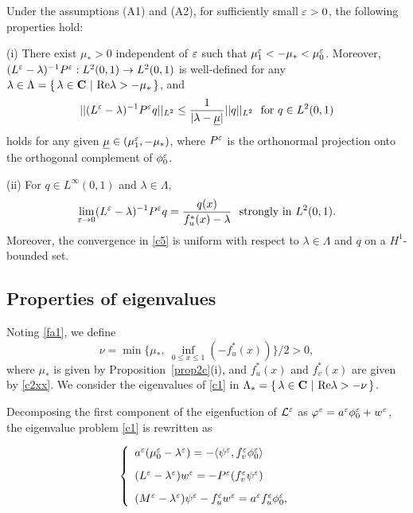 \documentclass[a4,10pt]{article}
\begin{document}
\begin{prop}\label{prop2c} 
Under the assumptions (A1) and (A2), for sufficiently small $\varepsilon > 0$, the following properties hold:

\no
{\rm (i)}  There exist $\mu_* > 0$ independent of $\varepsilon$
such that $ \mu_1^\varepsilon <  -\mu_* < \mu_0^\varepsilon$. Moreover,
$(L^\varepsilon - \lambda )^{-1}P^\varepsilon : L^2(0, 1) \to L^2(0, 1)$ is well-defined 
for any $\lambda \in \Lambda = 
\{ \, \lambda \in \mbox{\bf C} \  | \ \mbox{\rm Re} \lambda > - \mu_* \, \}$, and
%
\begin{equation}\label{c5z}
|| (L^\varepsilon - \lambda )^{-1}P^\varepsilon q ||_{L^2} \leq \displaystyle\frac{1}{|\lambda - \underline{\mu}|} ||q||_{L^2} \ \  \text{for} \ q \in L^2(0,1)
\end{equation}
%
holds for any given $\underline{\mu} \in ( \mu_1^\varepsilon, -\mu_*)$,
where $P^\varepsilon$ is the orthonormal projection onto the orthogonal complement of $\phi_0^\varepsilon$.

\no
{\rm (ii)} For $q \in L^\infty(0, 1)$ and $\lambda \in \Lambda$, 
%
\begin{equation}\label{c5}
\displaystyle\lim_{\varepsilon \to 0} (L^\varepsilon - \lambda)^{-1} P^\varepsilon q = \frac{ q(x)}{f_u^*(x) - \lambda}
\ \ \text{strongly in} \ L^2(0, 1).
\end{equation}
%
Moreover, the convergence in \eqref{c5}
is uniform with respect to $\lambda \in \Lambda$ and $q$ on a $H^1$-bounded set.
\end{prop}



\subsection{Properties of eigenvalues} \rm

Noting \eqref{fa1}, we define
%
\begin{equation}\label{c8}
\nu = \min\{ \mu_*  , \ \inf_{0 \leq x \leq 1} (- f_u^*(x) ) \} /2  > 0,
\end{equation}
%
where $\mu_*$ is given by Proposition~\ref{prop2c}(i), and 
$f_u^*(x)$ and $f_v^*(x)$ are given by \eqref{c2xx}. 
We consider the eigenvalues of \eqref{c1} in
$\Lambda_* = 
\{ \, \lambda \in \mbox{\bf C} \  | \ \mbox{\rm Re} \lambda > - \nu \, \}$.

Decomposing the first component of the eigenfuction of
$\mathcal{L}^\varepsilon$ as $\varphi^\varepsilon = a^\varepsilon \phi_0^\varepsilon + w^\varepsilon$,
the eigenvalue problem \eqref{c1} is rewritten as

\begin{equation}\label{c9}
\left \{
\begin{array}{l}
a^\varepsilon(\mu_0^\varepsilon - \lambda^\varepsilon) = - \langle \psi^\varepsilon, f_v^\varepsilon \phi^\varepsilon_0 \rangle  \\[2ex]
( L^\varepsilon - \lambda^\varepsilon ) w^\varepsilon = - P^\varepsilon(f_v^\varepsilon \psi^\varepsilon) \\[2ex]
( M^\varepsilon - \lambda^\varepsilon) \psi^\varepsilon - f_u^\varepsilon w^\varepsilon = a^\varepsilon f_u^\varepsilon \phi^\varepsilon_0,
\end{array} 
\right. 
\end{equation}
\end{document}
